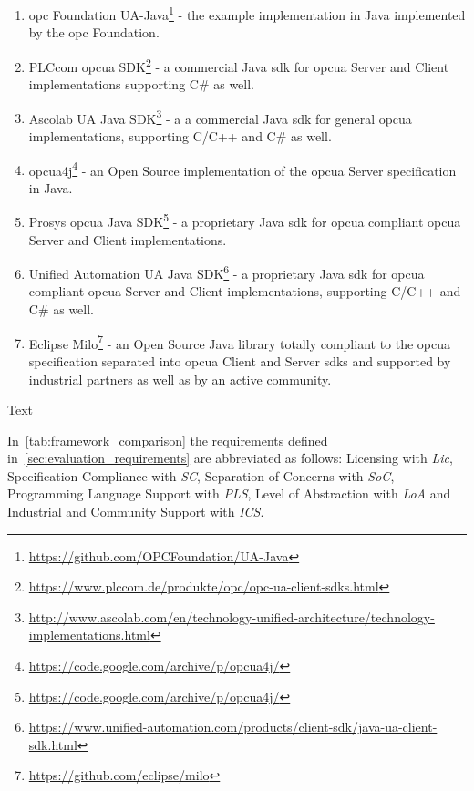 \documentclass[
a4paper,
twoside,
headsepline,
cleardoublepage=empty,
parskip=half,
draft=false
]{scrbook}
\begin{document}
			\begin{enumerate}
				
				\item \gls{opc} Foundation UA-Java\footnote{\url{https://github.com/OPCFoundation/UA-Java}} - the example implementation in Java implemented by the \gls{opc} Foundation.
				
				\item PLCcom \gls{opcua} SDK\footnote{\url{https://www.plccom.de/produkte/opc/opc-ua-client-sdks.html}} - a commercial Java \gls{sdk} for \gls{opcua} Server and Client implementations supporting C\# as well.
				
				\item Ascolab UA Java SDK\footnote{\url{http://www.ascolab.com/en/technology-unified-architecture/technology-implementations.html}} - a a commercial Java \gls{sdk} for general \gls{opcua} implementations, supporting C/C++ and C\# as well.
				
				\item opcua4j\footnote{\url{https://code.google.com/archive/p/opcua4j/}} - an Open Source implementation of the \gls{opcua} Server specification in Java.
				
				\item Prosys \gls{opcua} Java SDK\footnote{\url{https://code.google.com/archive/p/opcua4j/}} - a proprietary Java \gls{sdk} for \gls{opcua} compliant \gls{opcua} Server and Client implementations.
				
				\item Unified Automation UA Java SDK\footnote{\url{https://www.unified-automation.com/products/client-sdk/java-ua-client-sdk.html}} - a proprietary Java \gls{sdk} for \gls{opcua} compliant \gls{opcua} Server and Client implementations, supporting C/C++ and C\# as well.
				
				\item Eclipse Milo\footnote{\url{https://github.com/eclipse/milo}} - an Open Source Java library totally compliant to the \gls{opcua} specification separated into \gls{opcua} Client and Server \gls{sdk}s and supported by industrial partners as well as by an active community.
				
			\end{enumerate}
			
			Text
			
			In~\cref{tab:framework_comparison} the requirements defined in~\cref{sec:evaluation_requirements} are abbreviated as follows: Licensing with \textit{Lic}, Specification Compliance with \textit{SC}, Separation of Concerns with \textit{SoC}, Programming Language Support with \textit{PLS}, Level of Abstraction with \textit{LoA} and Industrial and Community Support with \textit{ICS}.
			
\end{document}
